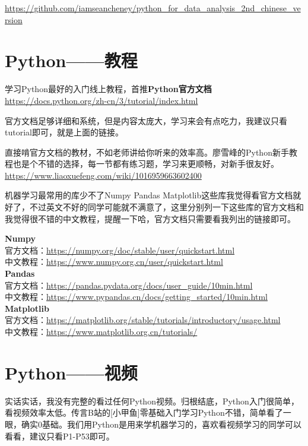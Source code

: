 \documentclass[]{ctexbook}
\begin{document}
\url{https://github.com/iamseancheney/python_for_data_analysis_2nd_chinese_version}

\hypertarget{pythonux6559ux7a0b}{%
\section{Python------教程}\label{pythonux6559ux7a0b}}

学习Python最好的入门线上教程，首推\textbf{Python官方文档}\\
\url{https://docs.python.org/zh-cn/3/tutorial/index.html}

官方文档足够详细和系统，但是内容太庞大，学习来会有点吃力，我建议只看tutorial即可，就是上面的链接。

直接啃官方文档的教材，不如老师讲给你听来的效率高。廖雪峰的Python新手教程也是个不错的选择，每一节都有练习题，学习来更顺畅，对新手很友好。\\
\url{https://www.liaoxuefeng.com/wiki/1016959663602400}

机器学习最常用的库少不了Numpy Pandas Matplotlib这些库我觉得看官方文档就好了，不过英文不好的同学可能就不满意了，这里分别列一下这些库的官方文档和我觉得很不错的中文教程，提醒一下哈，官方文档只需要看我列出的链接即可。

\textbf{Numpy}\\
官方文档：\url{https://numpy.org/doc/stable/user/quickstart.html}\\
中文教程：\url{https://www.numpy.org.cn/user/quickstart.html}\\
\textbf{Pandas}\\
官方文档：\url{https://pandas.pydata.org/docs/user_guide/10min.html}\\
中文教程：\url{https://www.pypandas.cn/docs/getting_started/10min.html}\\
\textbf{Matplotlib}\\
官方文档：\url{https://matplotlib.org/stable/tutorials/introductory/usage.html}\\
中文教程：\url{https://www.matplotlib.org.cn/tutorials/}

\hypertarget{pythonux89c6ux9891}{%
\section{Python------视频}\label{pythonux89c6ux9891}}

实话实话，我没有完整的看过任何Python视频。归根结底，Python入门很简单，看视频效率太低。传言B站的{[}小甲鱼{]}零基础入门学习Python不错，简单看了一眼，确实0基础。我们用Python是用来学机器学习的，喜欢看视频学习的同学可以看看，建议只看P1-P53即可。
\end{document}
